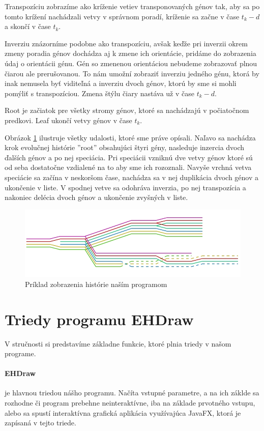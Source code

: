Transpozíciu zobrazíme ako kríženie vetiev transponovaných génov tak, aby sa po tomto krížení nachádzali vetvy v správnom poradí,
kríženie sa začne v čase $t_k - d$ a skončí v čase $t_k$.

Inverziu znázorníme podobne ako transpozíciu, avšak keďže pri inverzii okrem zmeny poradia génov dochádza aj k zmene ich orientácie, pridáme do zobrazenia údaj o orientácii génu.
Gén so zmenenou orientáciou nebudeme zobrazovať plnou čiarou ale prerušovanou. To nám umožní zobraziť inverziu jedného génu,
ktorá by inak nemusela byť viditeľná a inverziu dvoch génov, ktorú by sme si mohli pomýliť s transpozíciou. 
Zmena štýlu čiary nastáva už v čase  $t_k - d$.

Root je začiatok pre všetky stromy génov, ktoré sa nachádzajú v počiatočnom predkovi.
Leaf ukončí vetvy génov v čase $t_k$.

 
Obrázok \ref{obr:events} ilustruje všetky udalosti, ktoré sme práve opísali.
Naľavo sa nachádza krok evolučnej histórie ''root'' obsahujúci štyri gény,
nasleduje inzercia dvoch ďalších génov a po nej speciácia.
Pri speciácii vzniknú dve vetvy génov ktoré sú od seba dostatočne vzdialené na to aby sme ich rozoznali.
Navyše vrchná vetva speciácie sa začína v neskoršom čase, nachádza sa v nej duplikácia dvoch génov a ukončenie v liste.
V spodnej vetve sa odohráva inverzia, po nej transpozícia a nakoniec delécia dvoch génov a ukončenie zvyšných v liste.

\begin{figure}
\centerline{\includegraphics[width=1\textwidth]{images/udalosti}}
\caption{Príklad zobrazenia histórie naším programom}\label{obr:events}
\end{figure}

\section{Triedy programu EHDraw}
V stručnosti si predstavíme základne funkcie, ktoré plnia triedy v našom programe.
\paragraph{EHDraw} je hlavnou triedou nášho programu.
Načíta vstupné parametre, a na ich záklde sa rozhodne či program prebehne neinteraktívne, iba na základe prvotného vstupu, 
alebo sa spustí interaktívna grafická aplikácia využívajúca JavaFX, ktorá je zapísaná v tejto triede.
